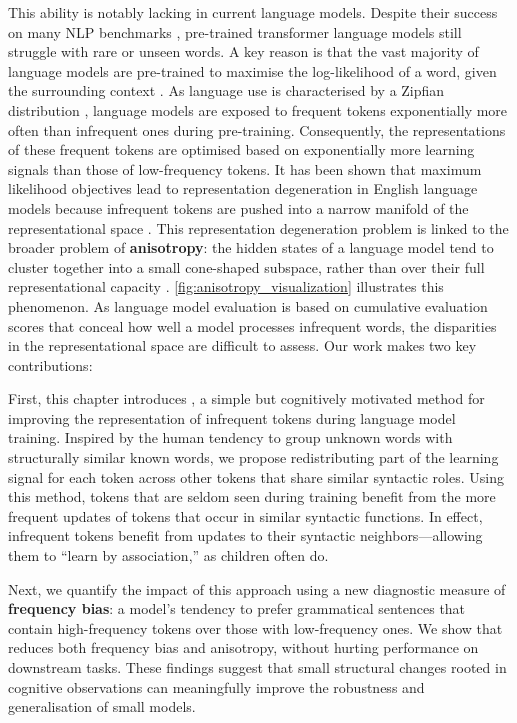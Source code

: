 This ability is notably lacking in current language models. Despite their success on many NLP benchmarks \citep{touvron2023llama, chowdhery2023palm}, pre-trained transformer language models still struggle with rare or unseen words. A key reason is that the vast majority of language models are pre-trained to maximise the log-likelihood of a word, given the surrounding context \citep{devlin2019bert, brown2020gpt3, chowdhery2023palm, touvron2023llama}. As language use is characterised by a Zipfian distribution \citep{zipf1935zipflaw}, language models are exposed to frequent tokens exponentially more often than infrequent ones during pre-training. Consequently, the representations of these frequent tokens are optimised based on exponentially more learning signals than those of low-frequency tokens. It has been shown that maximum likelihood objectives lead to representation degeneration in English language models because infrequent tokens are pushed into a narrow manifold of the representational space \citep{gao2018representation}. This representation degeneration problem is linked to the broader problem of \textbf{anisotropy}: the hidden states of a language model tend to cluster together into a small cone-shaped subspace, rather than over their full representational capacity \citep{arora2016latent, ethayarajh2019contextual, gao2018representation}. \cref{fig:anisotropy_visualization} illustrates this phenomenon. As language model evaluation is based on cumulative evaluation scores that conceal how well a model processes infrequent words, the disparities in the representational space are difficult to assess. Our work makes two key contributions:

First, this chapter introduces \smoothing, a simple but cognitively motivated method for improving the representation of infrequent tokens during language model training. Inspired by the human tendency to group unknown words with structurally similar known words, we propose redistributing part of the learning signal for each token across other tokens that share similar syntactic roles. Using this method, tokens that are seldom seen during training benefit from the more frequent updates of tokens that occur in similar syntactic functions.  In effect, infrequent tokens benefit from updates to their syntactic neighbors—allowing them to ``learn by association,'' as children often do.

Next, we quantify the impact of this approach using a new diagnostic measure of \textbf{frequency bias}: a model's tendency to prefer grammatical sentences that contain high-frequency tokens over those with low-frequency ones. We show that \smoothing reduces both frequency bias and anisotropy, without hurting performance on downstream tasks. These findings suggest that small structural changes rooted in cognitive observations can meaningfully improve the robustness and generalisation of small models.

